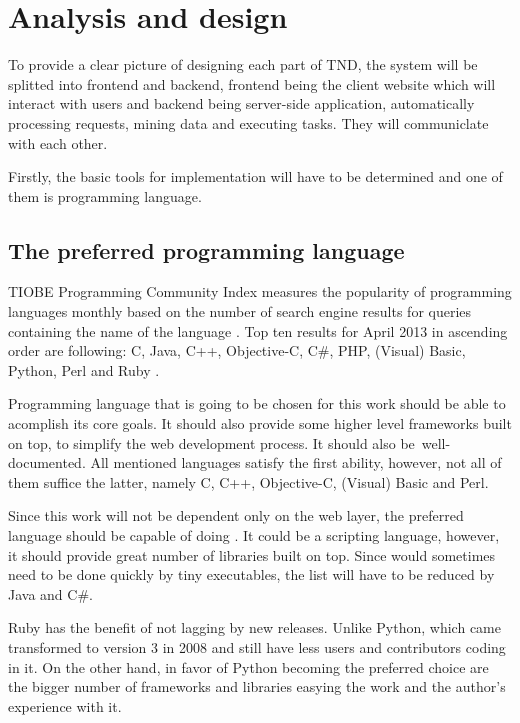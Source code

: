 \documentclass[thesis=B,english]{FITthesis}[2013/04/26]
\begin{document}
\chapter{Analysis and design}
\label{chapter:analysis_and_design}

To provide a clear picture of designing each part of TND, the system will be splitted into frontend and backend, frontend being the client website which will interact with users and backend being server-side application, automatically processing requests, mining data and executing tasks. They will communiclate with each other.

Firstly, the basic tools for implementation will have to be determined and one of them is programming language.

\section{The preferred programming language}

TIOBE Programming Community Index measures the popularity of programming languages monthly based on the number of search engine results for queries containing the name of the language \cite{tiobe_def}. Top ten results for April 2013 in ascending order are following: C, Java, C++, Objective-C, C\#, PHP, (Visual) Basic, Python, Perl and Ruby \cite{tiobe_res}.

Programming language that is going to be chosen for this work should be able to acomplish its core goals. It should also provide some higher level frameworks built on top, to simplify the web development process. It should also be~well-documented. All mentioned languages satisfy the first ability, however, not all of them suffice the latter, namely C, C++, Objective-C, (Visual) Basic and Perl.

Since this work will not be dependent only on the web layer, the preferred language should be capable of doing . It could be a scripting language, however, it should provide great number of libraries built on top. Since  would sometimes need to be done quickly by tiny executables, the list will have to be reduced by Java and C\#.

Ruby has the benefit of not lagging by new releases. Unlike Python, which came transformed to version 3 in 2008 and still have less users and contributors coding in it. \cite{TODO} On the other hand, in favor of Python becoming the preferred choice are the bigger number of frameworks and libraries easying the work \cite{TODO} and the author's experience with it. \\
\end{document}
